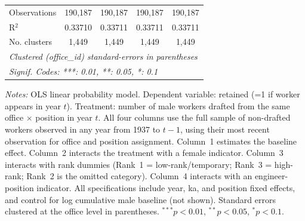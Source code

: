 \begin{table}[htbp]
\begin{threeparttable}
\begin{tabular}{lcccc}
   Observations                   & 190,187  & 190,187          & 190,187        & 190,187\\  
   R$^2$                          & 0.33710  & 0.33711          & 0.33711        & 0.33711\\  
   No. clusters & 1,449    & 1,449            & 1,449          & 1,449\\  
   \midrule \midrule
   \multicolumn{5}{l}{\emph{Clustered (office\_id) standard-errors in parentheses}}\\
   \multicolumn{5}{l}{\emph{Signif. Codes: ***: 0.01, **: 0.05, *: 0.1}}\\
\end{tabular}
\begin{tablenotes}[flushleft]
\footnotesize
\item \textit{Notes:} OLS linear probability model. Dependent variable: retained (=1 if worker appears in year $t$). Treatment: number of male workers drafted from the same office $\times$ position in year $t$. All four columns use the full sample of non-drafted workers observed in any year from 1937 to $t-1$, using their most recent observation for office and position assignment. Column~1 estimates the baseline effect. Column~2 interacts the treatment with a female indicator. Column~3 interacts with rank dummies (Rank~1 = low-rank/temporary; Rank~3 = high-rank; Rank~2 is the omitted category). Column~4 interacts with an engineer-position indicator. All specifications include year, ka, and position fixed effects, and control for log cumulative male baseline (not shown). Standard errors clustered at the office level in parentheses. $^{***}p<0.01$, $^{**}p<0.05$, $^{*}p<0.1$.
\end{tablenotes}
\end{threeparttable}
\end{table}
